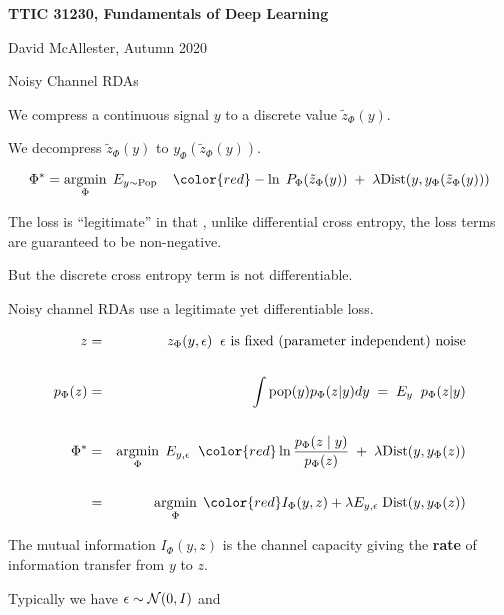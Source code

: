 





{\Huge

  \centerline{\bf TTIC 31230, Fundamentals of Deep Learning}
  \bigskip
  \centerline{David McAllester, Autumn 2020}
  \vfill
  \centerline{Noisy Channel RDAs}
  \vfill
  \vfill



We compress a continuous signal $y$ to a discrete value $\tilde{z}_\Phi(y)$.

\vfill
We decompress $\tilde{z}_\Phi(y)$ to $y_\Phi(\tilde{z}_\Phi(y))$.

\vfill
$$\Phi^* = \argmin_\Phi\; E_{y \sim \mathrm{Pop}}\;\;\;\;{\color{red} -\ln\;P_\Phi(\tilde{z}_\Phi(y))}\; +\; \lambda \mathrm{Dist}(y,y_\Phi(\tilde{z}_\Phi(y)))$$

\vfill
The loss is ``legitimate'' in that , unlike differential cross entropy, the loss terms are guaranteed to be non-negative.

\vfill
But the discrete cross entropy term is not differentiable.

\vfill
{\color{red} Noisy channel RDAs use a legitimate yet differentiable loss.}


\begin{eqnarray*}
z & = & z_\Phi(y,\epsilon) \;\;\mbox{$\epsilon$ is fixed (parameter independent) noise} \\
\\
p_{\Phi}(z) & = & \int \popd(y)p_\Phi(z|y)dy \;=\;  E_{y}\;\;p_\Phi(z|y) \\
\\
\Phi^* & = & \argmin_\Phi\; E_{y,\epsilon} \;\; {\color{red} \ln \frac{p_\Phi(z\; |\; y)}{p_\Phi(z)}}\; +\;\lambda\mathrm{Dist}(y,y_\Phi(z)) \\
\\
 & = & \argmin_\Phi \;{\color{red} I_\Phi(y,z)} + \lambda E_{y,\epsilon}\; \mathrm{Dist}(y,y_\Phi(z))
\end{eqnarray*}

\vfill
The mutual information {\color{red} $I_\Phi(y,z)$} is the channel capacity giving the {\bf rate} of information transfer from $y$ to $z$.


Typically we have $\epsilon \sim {\cal N}(0,I)$ and

}
